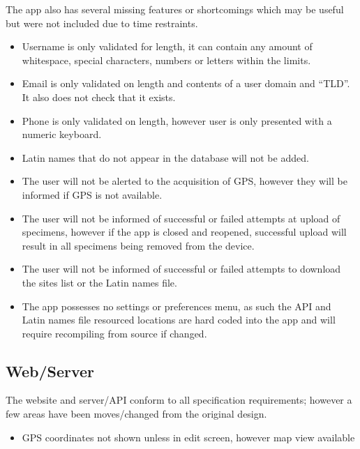     The app also has several missing features or shortcomings which may be useful but were not included due to time restraints. 
    \begin{itemize}
        \item Username is only validated for length, it can contain any amount of whitespace, special characters, numbers or letters within the limits.
        \item Email is only validated on length and contents of a user domain and ``TLD''. It also does not check that it exists.
        \item Phone is only validated on length, however user is only presented with a numeric keyboard.
        \item Latin names that do not appear in the database will not be added.
        \item The user will not be alerted to the acquisition of GPS, however they will be informed if GPS is not available. 
        \item The user will not be informed of successful or failed attempts at upload of specimens, however if the app is closed and reopened, successful upload will result in all specimens being removed from the device. 
        \item The user will not be informed of successful or failed attempts to download the sites list or the Latin names file.
        \item The app possesses no settings or preferences menu, as such the API and Latin names file resourced locations are hard coded into the app and will require recompiling from source if changed.
    \end{itemize}



\subsection{Web/Server}
    The website and server/API conform to all specification requirements; however a few areas have been moves/changed from the original design. 

    \begin{itemize}
        \item GPS coordinates not shown unless in edit screen, however map view available
    \end{itemize}
